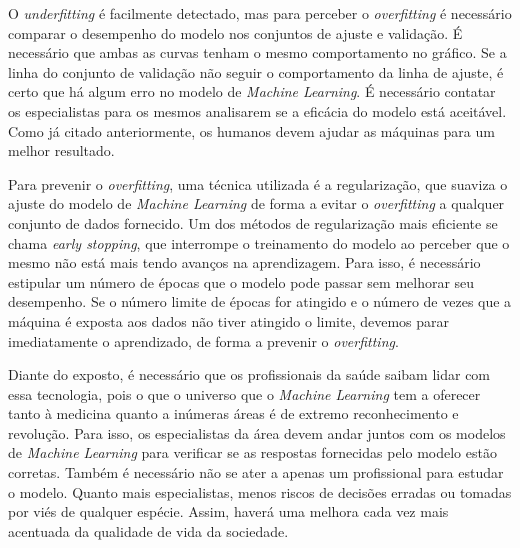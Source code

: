 \documentclass[journal]{IEEEtran}
\begin{document}
O \emph{underfitting} é facilmente detectado, mas para perceber o \emph{overfitting} é necessário comparar o desempenho do modelo nos conjuntos de ajuste e validação. É necessário que ambas as curvas tenham o mesmo comportamento no gráfico. Se a linha do conjunto de validação não seguir o comportamento da linha de ajuste, é certo que há algum erro no modelo de \emph{Machine Learning}. É necessário contatar os especialistas para os mesmos analisarem se a eficácia do modelo está aceitável. Como já citado anteriormente, os humanos devem ajudar as máquinas para um melhor resultado.

Para prevenir o \emph{overfitting}, uma técnica utilizada é a regularização, que suaviza o ajuste do modelo de \emph{Machine Learning} de forma a evitar o \emph{overfitting} a qualquer conjunto de dados fornecido. Um dos métodos de regularização mais eficiente se chama \emph{early stopping}, que interrompe o treinamento do modelo ao perceber que o mesmo não está mais tendo avanços na aprendizagem. Para isso, é necessário estipular um número de épocas que o modelo pode passar sem melhorar seu desempenho. Se o número limite de épocas for atingido e o número de vezes que a máquina é exposta aos dados não tiver atingido o limite, devemos parar imediatamente o aprendizado, de forma a prevenir o \emph{overfitting}.

Diante do exposto, é necessário que os profissionais da saúde saibam lidar com essa tecnologia, pois o que o universo que o \emph{Machine Learning} tem a oferecer tanto à medicina quanto a inúmeras áreas é de extremo reconhecimento e revolução. Para isso, os especialistas da área devem andar juntos com os modelos de \emph{Machine Learning} para verificar se as respostas fornecidas pelo modelo estão corretas. Também é necessário não se ater a apenas um profissional para estudar o modelo. Quanto mais especialistas, menos riscos de decisões erradas ou tomadas por viés de qualquer espécie. Assim, haverá uma melhora cada vez mais acentuada da qualidade de vida da sociedade.



\end{document}
